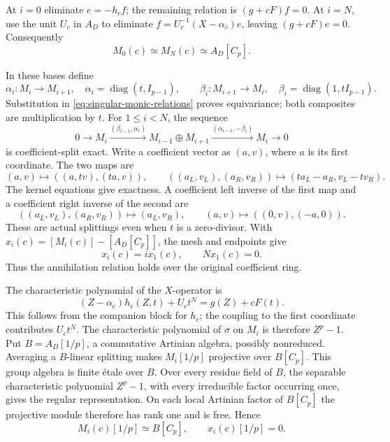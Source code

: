 At \(i=0\) eliminate \(e=-h_cf\); the remaining relation is
\((g+cF)f=0\).  At \(i=N\), use the unit \(U_c\) in \(A_D\)
to eliminate \(f=U_c^{-1}(X-\alpha_c)e\), leaving
\((g+cF)e=0\).  Consequently
\begin{equation}\label{eq:singular-monic-endpoints}
 M_0(c)\simeq M_N(c)\simeq A_D[C_p].
\end{equation}

In these bases define
\[
 \alpha_i:M_i\longrightarrow M_{i+1},\quad
 \alpha_i=\operatorname{diag}(t,I_{p-1}),\qquad
 \beta_i:M_{i+1}\longrightarrow M_i,\quad
 \beta_i=\operatorname{diag}(1,tI_{p-1}).
\]
Substitution in \eqref{eq:singular-monic-relations} proves
equivariance; both composites are multiplication by \(t\).
For \(1\le i<N\), the sequence
\begin{equation}\label{eq:singular-monic-mesh}
 0\longrightarrow M_i
 \xrightarrow{(\beta_{i-1},\alpha_i)}M_{i-1}\oplus M_{i+1}
 \xrightarrow{(\alpha_{i-1},-\beta_i)}M_i\longrightarrow0
\end{equation}
is coefficient-split exact.  Write a coefficient vector as \((a,v)\),
where \(a\) is its first coordinate.  The two maps are
\[
 (a,v)\longmapsto((a,tv),(ta,v)),\qquad
 ((a_L,v_L),(a_R,v_R))\longmapsto
                  (ta_L-a_R,v_L-tv_R).
\]
The kernel equations give exactness.  A coefficient left inverse
of the first map and a coefficient right inverse of the second are
\[
 ((a_L,v_L),(a_R,v_R))\longmapsto(a_L,v_R),\qquad
 (a,v)\longmapsto((0,v),(-a,0)).
\]
These are actual splittings even when \(t\) is a zero-divisor.
With \(x_i(c)=[M_i(c)]-[A_D[C_p]]\), the mesh and endpoints give
\begin{equation}\label{eq:singular-monic-annihilation}
 x_i(c)=i x_1(c),\qquad Nx_1(c)=0.
\end{equation}
Thus the annihilation relation holds over the original coefficient ring.

The characteristic polynomial of the \(X\)-operator is
\[
 (Z-\alpha_c)h_c(Z,t)+U_ct^N=g(Z)+cF(t).
\]
This follows from the companion block for \(h_c\); the coupling
to the first coordinate contributes \(U_ct^N\).  The characteristic
polynomial of \(\sigma\) on \(M_i\) is therefore \(Z^p-1\).
Put \(B=A_D[1/p]\), a commutative Artinian algebra, possibly
nonreduced.  Averaging a \(B\)-linear splitting makes
\(M_i[1/p]\) projective over \(B[C_p]\).  This group algebra is
finite \'etale over \(B\).  Over every residue field of \(B\),
the separable characteristic polynomial \(Z^p-1\), with every
irreducible factor occurring once, gives the regular representation.
On each local Artinian factor of \(B[C_p]\) the projective module
therefore has rank one and is free.  Hence
\begin{equation}\label{eq:singular-monic-generic-zero}
 M_i(c)[1/p]\simeq B[C_p],\qquad x_i(c)[1/p]=0.
\end{equation}


